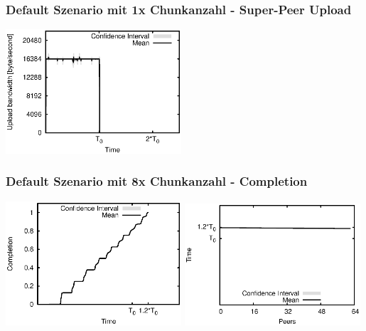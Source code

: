 \begin{frame}
  \frametitle{Default Szenario mit 1x Chunkanzahl - Super-Peer Upload}
  \begin{center}
    \includegraphics[width=0.49\textwidth]{fig/plots/scenario_7_chunk_count_fac_1/plots/GeneratedMeanCurrentSuperSeederUploadBandwidth.csv.eps}
  \end{center}
\end{frame}


\begin{frame}
  \frametitle{Default Szenario mit 8x Chunkanzahl - Completion}
  \begin{center}
    \includegraphics[width=0.49\textwidth]{fig/plots/scenario_16_chunk_count_fac_8/plots/GeneratedMeanChunkCompletion.csv.eps}
    \hfill
    \includegraphics[width=0.49\textwidth]{fig/plots/scenario_16_chunk_count_fac_8/plots/GeneratedMeanSortedChunkCompletion.csv.eps}
  \end{center}
\end{frame}


